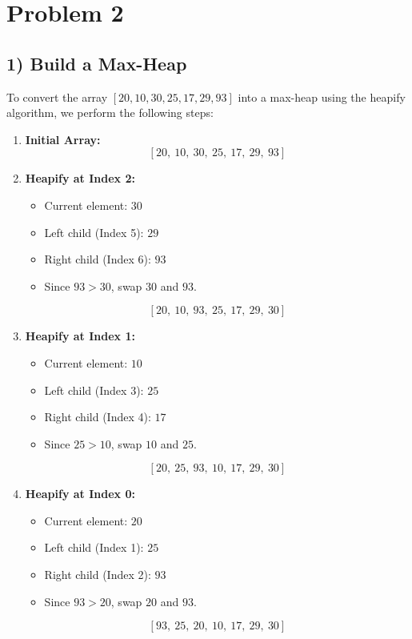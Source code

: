 \documentclass{cs1204}
\author{Rushil Gupta}
\begin{document}
\section*{Problem 2}

\subsection*{1) Build a Max-Heap}

To convert the array \([20, 10, 30, 25, 17, 29, 93]\) into a max-heap using the heapify algorithm, we perform the following steps:

\begin{enumerate}[label=\textbf{\arabic*.}]
    \item \textbf{Initial Array:}
    \[
    [20, \ 10, \ 30, \ 25, \ 17, \ 29, \ 93]
    \]
    
    \item \textbf{Heapify at Index 2:}
    \begin{itemize}
        \item Current element: \(30\)
        \item Left child (Index 5): \(29\)
        \item Right child (Index 6): \(93\)
        \item Since \(93 > 30\), swap \(30\) and \(93\).
    \end{itemize}
    \[
    [20, \ 10, \ 93, \ 25, \ 17, \ 29, \ 30]
    \]
    
    \item \textbf{Heapify at Index 1:}
    \begin{itemize}
        \item Current element: \(10\)
        \item Left child (Index 3): \(25\)
        \item Right child (Index 4): \(17\)
        \item Since \(25 > 10\), swap \(10\) and \(25\).
    \end{itemize}
    \[
    [20, \ 25, \ 93, \ 10, \ 17, \ 29, \ 30]
    \]
    
    \item \textbf{Heapify at Index 0:}
    \begin{itemize}
        \item Current element: \(20\)
        \item Left child (Index 1): \(25\)
        \item Right child (Index 2): \(93\)
        \item Since \(93 > 20\), swap \(20\) and \(93\).
    \end{itemize}
    \[
    [93, \ 25, \ 20, \ 10, \ 17, \ 29, \ 30]
    \]
    

\end{enumerate}
\end{document}
